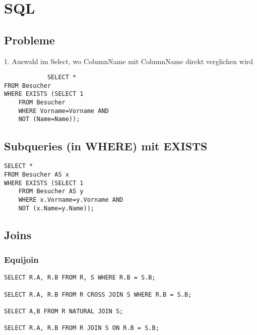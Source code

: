 \documentclass{article}
\begin{document}
	
	\section{SQL}
	
	\subsection{Probleme}
	1. Auswahl im Select, wo ColumnName mit ColumnName direkt verglichen wird
	
	\begin{verbatim}
			SELECT *
FROM Besucher
WHERE EXISTS (SELECT 1
	FROM Besucher
	WHERE Vorname=Vorname AND
	NOT (Name=Name));

	\end{verbatim}


	
	\subsection{Subqueries (in WHERE) mit EXISTS}
	

\begin{verbatim}
SELECT *
FROM Besucher AS x
WHERE EXISTS (SELECT 1
	FROM Besucher AS y
	WHERE x.Vorname=y.Vorname AND
	NOT (x.Name=y.Name));
\end{verbatim}


\subsection{Joins}
\subsubsection{Equijoin}
\color{red}{Kreuzprodukt + Selektionsprädikat für gemeinsame Attrivute + autom. Umbenennung/Projektion von Attributen}

\begin{verbatim}
SELECT R.A, R.B FROM R, S WHERE R.B = S.B;	

SELECT R.A, R.B FROM R CROSS JOIN S WHERE R.B = S.B;

SELECT A,B FROM R NATURAL JOIN S;

SELECT R.A, R.B FROM R JOIN S ON R.B = S.B;
\end{verbatim}

	
\end{document}
